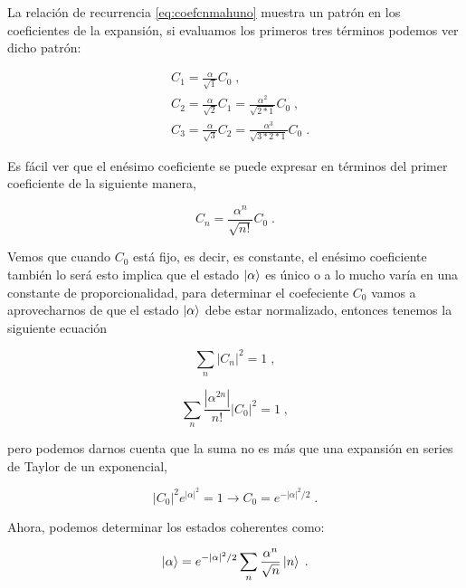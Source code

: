             La relación de recurrencia \ref{eq:coefcnmahuno} muestra un patrón en los coeficientes de la expansión, si evaluamos los primeros tres términos podemos ver dicho patrón:

            \begin{align*}
                & C_1 = \frac{\alpha}{\sqrt{1}}C_0\;,\\
                & C_2 = \frac{\alpha}{\sqrt{2}}C_1 = \frac{\alpha^2}{\sqrt{2*1}}C_0\;,\\
                & C_3 = \frac{\alpha}{\sqrt{3}}C_2 = \frac{\alpha^3}{\sqrt{3*2*1}}C_0\;.
            \end{align*}

            Es fácil ver que el enésimo coeficiente se puede expresar en términos del primer coeficiente de la siguiente manera,

            \begin{equation}
                C_n = \frac{\alpha^n}{\sqrt{n!}}C_0\;.
            \end{equation}

            Vemos que cuando $C_0$ está fijo, es decir, es constante, el enésimo coeficiente también lo será esto implica que el estado $\ket{\alpha}$ es único o a lo mucho varía en una constante de proporcionalidad, para determinar el coefeciente $C_0$ vamos a aprovecharnos de que el estado $\ket{\alpha}$ debe estar normalizado, entonces tenemos la siguiente ecuación 

            \begin{equation}
                \sum_n |C_n|^2 = 1\;,
            \end{equation}

            \begin{equation}
                \sum_n \frac{|\alpha^{2n}|}{n!}|C_0|^2 = 1\;,
            \end{equation}

            pero podemos darnos cuenta que la suma no es más que una expansión en series de Taylor de un exponencial,

            \begin{equation}
                |C_0|^2 e^{|\alpha|^2} = 1 \rightarrow C_0 = e^{-|\alpha|^2/2}\;.
            \end{equation}

            Ahora, podemos determinar los estados coherentes como:

            \begin{equation}\label{eq:CoherentStates}
                \ket{\alpha} = e^{-|\alpha|^2/2}\sum_n \frac{\alpha^n}{\sqrt{n}}\ket{n}\;.
            \end{equation}


